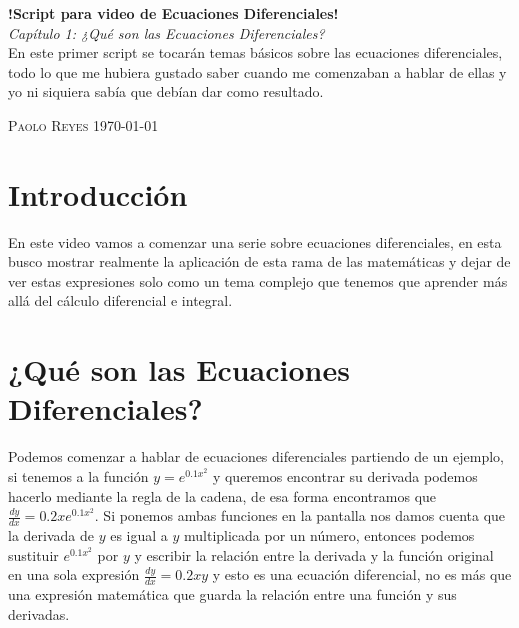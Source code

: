 \documentclass[12pt, letterpaper]{article}
\begin{document}
    \begin{titlepage}
        \begin{center}
            \vspace{4cm}
            \textbf{\Huge{!Script para video de Ecuaciones Diferenciales!\\}}
            \vspace{3cm}
            \textit{\Large{Capítulo 1: ¿Qué son las Ecuaciones Diferenciales?\\}}
            \vfill
            \justifying
            \noindent
            \textnormal{En este primer script se tocarán temas básicos sobre las ecuaciones diferenciales, todo lo que me hubiera gustado saber cuando me comenzaban a hablar de ellas y yo ni siquiera sabía que debían dar como resultado.}
        \end{center}
        \vfill
        \textsc{Paolo Reyes}\hfill
        \textsc{\today}
    \end{titlepage}
    
    \tableofcontents{}
    \newpage

    \section{Introducción}
        \noindent
            En este video vamos a comenzar una serie sobre ecuaciones diferenciales, en esta busco mostrar realmente la aplicación de esta rama de las matemáticas y dejar de ver estas expresiones solo como un tema complejo que tenemos que aprender más allá del cálculo diferencial e integral.

    \section{¿Qué son las Ecuaciones Diferenciales?}
        \noindent
            Podemos comenzar a hablar de ecuaciones diferenciales partiendo de un ejemplo, si tenemos a la función $y = e^{0.1x^2}$ y queremos encontrar su derivada podemos hacerlo mediante la regla de la cadena, de esa forma encontramos que $\frac{dy}{dx} = 0.2x e^{0.1x^2}$. Si ponemos ambas funciones en la pantalla nos damos cuenta que la derivada de $y$ es igual a $y$ multiplicada por un número, entonces podemos sustituir $e^{0.1x^2}$ por $y$ y escribir la relación entre la derivada y la función original en una sola expresión $\frac{dy}{dx} = 0.2xy$ y esto es una ecuación diferencial, no es más que una expresión matemática que guarda la relación entre una función y sus derivadas.
\end{document}
